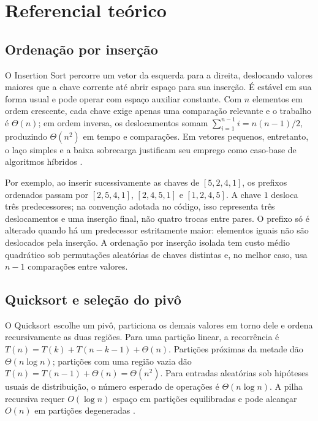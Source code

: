 \chapter{Referencial teórico}
\label{cap:desenvolvimento}

\section{Ordenação por inserção}

O Insertion Sort percorre um vetor da esquerda para a direita, deslocando valores maiores que a chave corrente até abrir espaço para sua inserção. É estável em sua forma usual e pode operar com espaço auxiliar constante. Com $n$ elementos em ordem crescente, cada chave exige apenas uma comparação relevante e o trabalho é $\Theta(n)$; em ordem inversa, os deslocamentos somam $\sum_{i=1}^{n-1}i=n(n-1)/2$, produzindo $\Theta(n^2)$ em tempo e comparações. Em vetores pequenos, entretanto, o laço simples e a baixa sobrecarga justificam seu emprego como caso-base de algoritmos híbridos \cite{gfg_insertion,gfg_insertion_complexity}.

Por exemplo, ao inserir sucessivamente as chaves de $[5,2,4,1]$, os prefixos ordenados passam por $[2,5,4,1]$, $[2,4,5,1]$ e $[1,2,4,5]$. A chave $1$ desloca três predecessores; na convenção adotada no código, isso representa três deslocamentos e uma inserção final, não quatro trocas entre pares. O prefixo só é alterado quando há um predecessor estritamente maior: elementos iguais não são deslocados pela inserção. A ordenação por inserção isolada tem custo médio quadrático sob permutações aleatórias de chaves distintas e, no melhor caso, usa $n-1$ comparações entre valores.

\section{Quicksort e seleção do pivô}

O Quicksort escolhe um pivô, particiona os demais valores em torno dele e ordena recursivamente as duas regiões. Para uma partição linear, a recorrência é $T(n)=T(k)+T(n-k-1)+\Theta(n)$. Partições próximas da metade dão $\Theta(n\log n)$; partições com uma região vazia dão $T(n)=T(n-1)+\Theta(n)=\Theta(n^2)$. Para entradas aleatórias sob hipóteses usuais de distribuição, o número esperado de operações é $\Theta(n\log n)$. A pilha recursiva requer $O(\log n)$ espaço em partições equilibradas e pode alcançar $O(n)$ em partições degeneradas \cite{cormen2012,gfg_quick}.

